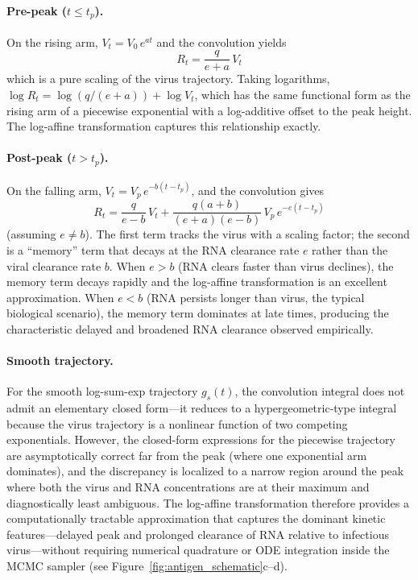 \begin{appendix}
\paragraph{Pre-peak ($t \leq t_p$).} On the rising arm, $V_t = V_0\,e^{at}$ and the convolution yields
\begin{equation*}
    R_t = \frac{q}{e + a}\,V_t
\end{equation*}
which is a pure scaling of the virus trajectory. Taking logarithms, $\log R_t = \log(q/(e+a)) + \log V_t$, which has the same functional form as the rising arm of a piecewise exponential with a log-additive offset to the peak height. The log-affine transformation captures this relationship exactly.

\paragraph{Post-peak ($t > t_p$).} On the falling arm, $V_t = V_p\,e^{-b(t-t_p)}$, and the convolution gives
\begin{equation*}
    R_t = \frac{q}{e - b}\,V_t + \frac{q(a + b)}{(e + a)(e - b)}\,V_p\,e^{-e(t-t_p)}
\end{equation*}
(assuming $e \neq b$). The first term tracks the virus with a scaling factor; the second is a ``memory'' term that decays at the RNA clearance rate $e$ rather than the viral clearance rate $b$. When $e > b$ (RNA clears faster than virus declines), the memory term decays rapidly and the log-affine transformation is an excellent approximation. When $e < b$ (RNA persists longer than virus, the typical biological scenario), the memory term dominates at late times, producing the characteristic delayed and broadened RNA clearance observed empirically.

\paragraph{Smooth trajectory.} For the smooth log-sum-exp trajectory $g_s(t)$, the convolution integral does not admit an elementary closed form---it reduces to a hypergeometric-type integral because the virus trajectory is a nonlinear function of two competing exponentials. However, the closed-form expressions for the piecewise trajectory are asymptotically correct far from the peak (where one exponential arm dominates), and the discrepancy is localized to a narrow region around the peak where both the virus and RNA concentrations are at their maximum and diagnostically least ambiguous. The log-affine transformation therefore provides a computationally tractable approximation that captures the dominant kinetic features---delayed peak and prolonged clearance of RNA relative to infectious virus---without requiring numerical quadrature or ODE integration inside the MCMC sampler (see Figure~\ref{fig:antigen_schematic}c--d).


\end{appendix}
